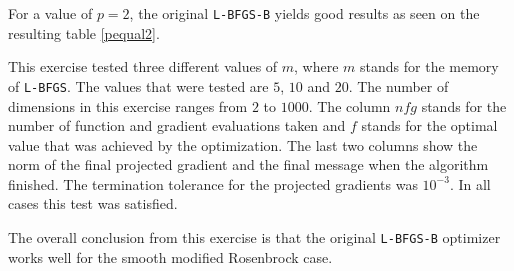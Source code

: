 For a value of $p = 2$, the original \texttt{L-BFGS-B} yields good results as seen on the resulting table \ref{pequal2}.

This exercise tested three different values of $m$, where $m$ stands for the memory of \texttt{L-BFGS}. The values that were tested are $5$, $10$ and $20$. The number of dimensions in this exercise ranges from $2$ to $1000$. The column $nfg$ stands for the number of function and gradient evaluations taken and $f$ stands for the optimal value that was achieved by the optimization. The last two columns show the norm of the final projected gradient and the final message when the algorithm finished. The termination tolerance for the projected gradients was $10^{-3}$. In all cases this test was satisfied.

The overall conclusion from this exercise is that the original \texttt{L-BFGS-B} optimizer works well for the smooth modified Rosenbrock case.

